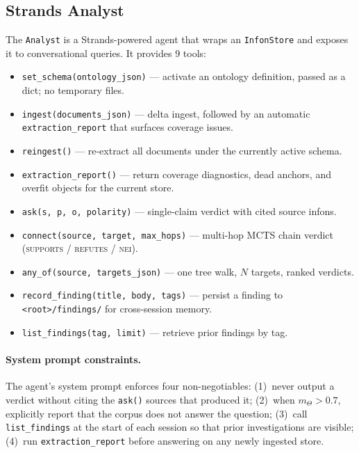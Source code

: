 \subsection{Strands Analyst}
\label{sec:implementation:analyst}

The \texttt{Analyst} is a Strands-powered agent that wraps an
\texttt{InfonStore} and exposes it to conversational queries.  It provides
9 tools:

\begin{itemize}
  \item \texttt{set\_schema(ontology\_json)} --- activate an ontology
    definition, passed as a dict; no temporary files.
  \item \texttt{ingest(documents\_json)} --- delta ingest, followed by an
    automatic \texttt{extraction\_report} that surfaces coverage issues.
  \item \texttt{reingest()} --- re-extract all documents under the currently
    active schema.
  \item \texttt{extraction\_report()} --- return coverage diagnostics, dead
    anchors, and overfit objects for the current store.
  \item \texttt{ask(s, p, o, polarity)} --- single-claim verdict with cited
    source infons.
  \item \texttt{connect(source, target, max\_hops)} --- multi-hop MCTS chain
    verdict (\textsc{supports} / \textsc{refutes} / \textsc{nei}).
  \item \texttt{any\_of(source, targets\_json)} --- one tree walk, $N$ targets,
    ranked verdicts.
  \item \texttt{record\_finding(title, body, tags)} --- persist a finding to
    \texttt{<root>/findings/} for cross-session memory.
  \item \texttt{list\_findings(tag, limit)} --- retrieve prior findings by
    tag.
\end{itemize}

\paragraph{System prompt constraints.}
The agent's system prompt enforces four non-negotiables: (1)~never output a
verdict without citing the \texttt{ask()} sources that produced it;
(2)~when $m_\Theta > 0.7$, explicitly report that the corpus does not answer
the question; (3)~call \texttt{list\_findings} at the start of each session
so that prior investigations are visible; (4)~run \texttt{extraction\_report}
before answering on any newly ingested store.

